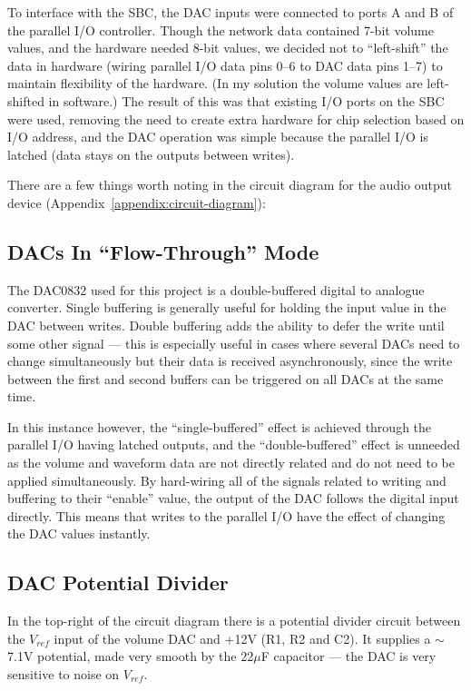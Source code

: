 To interface with the SBC, the DAC inputs were connected to ports A and B of the parallel I/O 
controller.  Though the network data contained 7-bit volume values, and the hardware needed 8-bit 
values, we decided not to ``left-shift'' the data in hardware (wiring parallel I/O data pins 0--6 to 
DAC data pins 1--7) to maintain flexibility of the hardware.  (In my solution the volume values are 
left-shifted in software.)  The result of this was that existing I/O ports on the SBC were used, 
removing the need to create extra hardware for chip selection based on I/O address, and the DAC 
operation was simple because the parallel I/O is latched (data stays on the outputs between writes).

There are a few things worth noting in the circuit diagram for the audio output device 
(Appendix~\ref{appendix:circuit-diagram}):

\subsection{DACs In ``Flow-Through'' Mode}

The DAC0832 used for this project is a double-buffered digital to analogue converter.  Single 
buffering is generally useful for holding the input value in the DAC between writes.  Double 
buffering adds the ability to defer the write until some other signal --- this is especially useful 
in cases where several DACs need to change simultaneously but their data is received asynchronously, 
since the write between the first and second buffers can be triggered on all DACs at the same time.

In this instance however, the ``single-buffered'' effect is achieved through the parallel I/O having 
latched outputs, and the ``double-buffered'' effect is unneeded as the volume and waveform data are 
not directly related and do not need to be applied simultaneously.  By hard-wiring all of the 
signals related to writing and buffering to their ``enable'' value, the output of the DAC follows 
the digital input directly.  This means that writes to the parallel I/O have the effect of changing 
the DAC values instantly.

\subsection{DAC Potential Divider}

In the top-right of the circuit diagram there is a potential divider circuit between the $V_{ref}$ 
input of the volume DAC and +12V (R1, R2 and C2).  It supplies a $\sim$7.1V potential, made very 
smooth by the 22$\mu$F capacitor --- the DAC is very sensitive to noise on $V_{ref}$.

